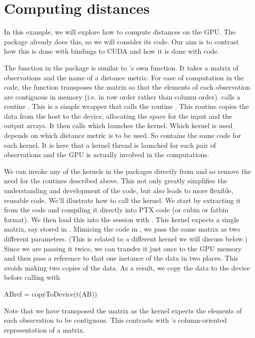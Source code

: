 \section{Computing distances}

In this example, we will explore how to compute distances on the GPU.
The  package already does this, so we will consider its
code.  Our aim is to contrast how this is done with \R{} bindings to
CUDA and how it is done with \C{} code.

The  function in the  package is similar
to \R's own  function.  It takes a matrix of observations
and the name of a distance metric.  For ease of computation in the
\C{} code, the function transposes the matrix so that the elements of
each observation are contiguous in memory (i.e. in row order rather
than column order).   calls a \C{} routine
.  This is a simple wrapper that calls the routine
.  This routine copies the data from the host to the
device, allocating the space for the input and the output arrays.  It
then calls  which launches the kernel.  Which
kernel is used depends on which distance metric is to be used.  So
 contains the same code for each kernel.  It is
here that a kernel thread is launched for each pair of observations
and the GPU is actually involved in the computations.


We can invoke any of the kernels in the  packages
directly from \R and so remove the need for the \C{} routines
described above. This not only greatly simplifies the understanding
and development of the code, but also leads to more flexible, reusable
code.  We'll illustrate how to call the 
kernel.  We start by extracting it from the \C{} code and compiling it
directly into PTX code (or cubin or fatbin format).  We then load this
into the \R{} session with .
This kernel expects a single matrix, say stored in .
Mimicing the \C{} code in , we pass the same
matrix as two different parameters. (This is related to a different
kernel we will  discuss below.)
Since we are passing it twice, we can transfer it just once to the GPU
memory and then pass a reference to that one instance of the data
in two places. This avoids making two copies of the data.
As a result, we copy the data to the device before calling
 with
\begin{RCode}
ABref = copyToDevice(t(AB))
\end{RCode}
Note that we have transposed the matrix as the kernel
expects the elements of each observation to be contiguous.
This contrasts with \R's column-oriented representation of a matrix.

